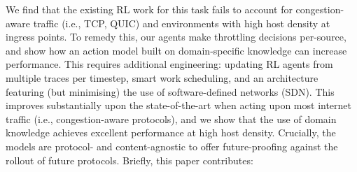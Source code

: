 \documentclass[10pt, times, conference, letterpaper]{IEEEtran}
\begin{document}
We find that the existing RL work for this task fails to account for congestion-aware traffic (i.e., TCP, QUIC) and environments with high host density at ingress points.
To remedy this, our agents make throttling decisions per-source, and show how an action model built on domain-specific knowledge can increase performance.
This requires additional engineering: updating RL agents from multiple traces per timestep, smart work scheduling, and an architecture featuring (but minimising) the use of software-defined networks (SDN).
This improves substantially upon the state-of-the-art when acting upon most internet traffic (i.e., congestion-aware protocols), and we show that the use of domain knowledge achieves excellent performance at high host density.
Crucially, the models are protocol- and content-agnostic to offer future-proofing against the rollout of future protocols.
Briefly, this paper contributes:
\end{document}
